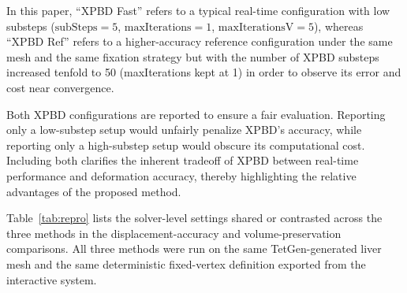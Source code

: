 \documentclass{ieeeaccess}
\begin{document}
In this paper, ``XPBD Fast'' refers to a typical real-time configuration with low substeps ($\text{subSteps}=5$, $\text{maxIterations}=1$, $\text{maxIterationsV}=5$), whereas ``XPBD Ref'' refers to a higher-accuracy reference configuration under the same mesh and the same fixation strategy but with the number of XPBD substeps increased tenfold to 50 (maxIterations kept at 1) in order to observe its error and cost near convergence.

Both XPBD configurations are reported to ensure a fair evaluation. Reporting only a low-substep setup would unfairly penalize XPBD's accuracy, while reporting only a high-substep setup would obscure its computational cost. Including both clarifies the inherent tradeoff of XPBD between real-time performance and deformation accuracy, thereby highlighting the relative advantages of the proposed method.

Table~\ref{tab:repro} lists the solver-level settings shared or contrasted across the three methods in the displacement-accuracy and volume-preservation comparisons. All three methods were run on the same TetGen-generated liver mesh and the same deterministic fixed-vertex definition exported from the interactive system.
\end{document}
